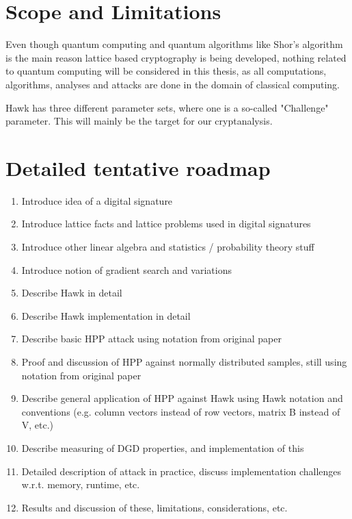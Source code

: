 \section{Scope and Limitations}
Even though quantum computing and quantum algorithms like Shor's algorithm is the main reason lattice based cryptography is being developed, nothing related 
to quantum computing will be considered in this thesis, as all computations, algorithms, analyses and attacks are done in the domain of classical computing.

Hawk has three different parameter sets, where one is a so-called "Challenge" parameter. This will mainly be the target for our cryptanalysis.

\section{Detailed tentative roadmap}
\begin{enumerate}
    \item Introduce idea of a digital signature
    \item Introduce lattice facts and lattice problems used in digital signatures
    \item Introduce other linear algebra and statistics / probability theory stuff
    \item Introduce notion of gradient search and variations
    \item Describe Hawk in detail
    \item Describe Hawk implementation in detail
    \item Describe basic HPP attack using notation from original paper
    \item Proof and discussion of HPP against normally distributed samples, still using notation from original paper
    \item Describe general application of HPP against Hawk using Hawk notation and conventions (e.g. column vectors instead of row vectors,
        matrix B instead of V, etc.)
    \item Describe measuring of DGD properties, and implementation of this
    \item Detailed description of attack in practice, discuss implementation challenges w.r.t. memory, runtime, etc.
    \item Results and discussion of these, limitations, considerations, etc.
\end{enumerate}

